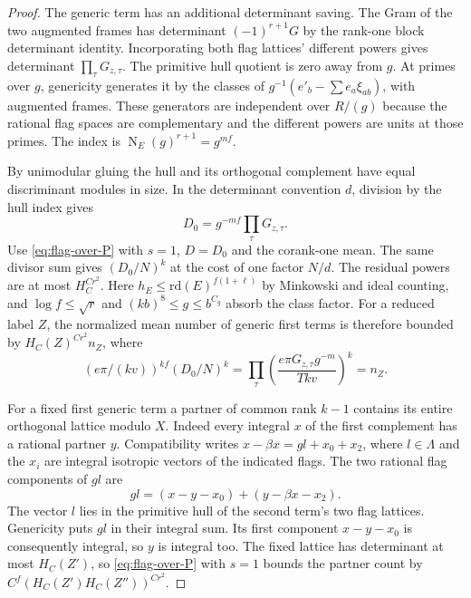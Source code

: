 \begin{proof}

The generic term has an additional determinant saving.
The Gram of the two augmented frames has determinant
\((-1)^{r+1}G\) by the rank-one block determinant
identity. Incorporating both flag lattices' different
powers gives determinant \(\prod_\tau G_{z,\tau}\).
The primitive hull quotient is zero away from \(g\).
At primes over \(g\), genericity generates it by the
classes of \(g^{-1}(e'_b-\sum e_a\xi_{ab})\), with
augmented frames. These generators are independent
over \(R/(g)\) because the rational flag spaces are
complementary and the different powers are units
at those primes. The index is \(\operatorname N_E(g)^{r+1}=g^{mf}\).

By unimodular gluing the hull and its orthogonal complement have
equal discriminant modules in size. In the determinant convention
\(d\), division by the hull index gives
\[
       D_0=g^{-mf}\prod_\tau G_{z,\tau}.
\]
Use \eqref{eq:flag-over-P} with \(s=1\), \(D=D_0\)
and the corank-one mean. The same divisor sum gives
\((D_0/N)^k\) at the cost of one factor \(N/d\).
The residual powers are at most \(H_C^{Cr^2}\).
Here \(h_E\leq\mathrm{rd}(E)^{f(1+\ell)}\) by Minkowski
and ideal counting, and \(\log f\leq\sqrt r\) and
\((kb)^8\leq g\leq b^{C_g}\) absorb the class factor.
For a reduced label \(Z\), the normalized mean number of generic
first terms is therefore bounded by \(H_C(Z)^{Cr^2} n_Z\), where
\begin{equation}\label{eq:generic-first-term-factor}
 (e\pi/(kv))^{kf}(D_0/N)^k
 =\prod_\tau\left(\frac{e\pi G_{z,\tau}g^{-m}}{Tkv}\right)^k=n_Z .
\end{equation}


For a fixed first generic term a partner of common
rank \(k-1\) contains its entire orthogonal lattice
modulo \(X\). Indeed every integral \(x\) of the first
complement has a rational partner \(y\).
Compatibility writes \(x-\beta x=g l+x_0+x_2\), where
\(l\in\Lambda\) and the \(x_i\) are integral isotropic vectors
of the indicated flags. The two rational flag components of
\(g l\) are
\[
     g l=(x-y-x_0)+(y-\beta x-x_2).
\]
The vector \(l\) lies in the primitive hull of the second term's
two flag lattices. Genericity puts \(g l\) in their integral sum.
Its first component \(x-y-x_0\) is consequently integral, so
\(y\) is integral too.
The fixed lattice has determinant at most \(H_C(Z')\),
so \eqref{eq:flag-over-P} with \(s=1\) bounds the
partner count by \(C^f(H_C(Z')H_C(Z''))^{Cr^2}\).

\end{proof}


